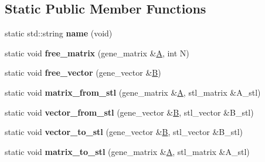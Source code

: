 \subsection*{Static Public Member Functions}
\begin{DoxyCompactItemize}
\item 
\mbox{\label{classublas__interface_a32117e7ead7a2a8f4e3d061c62effb40}} 
static std\+::string {\bfseries name} (void)
\item 
\mbox{\label{classublas__interface_a21c3496aaa06183e49f5cb6e07b50860}} 
static void {\bfseries free\+\_\+matrix} (gene\+\_\+matrix \&\hyperlink{group___core___module_class_eigen_1_1_matrix}{A}, int N)
\item 
\mbox{\label{classublas__interface_a82dfbf57b22b1604aa1027949fa89f06}} 
static void {\bfseries free\+\_\+vector} (gene\+\_\+vector \&\hyperlink{group___core___module_class_eigen_1_1_matrix}{B})
\item 
\mbox{\label{classublas__interface_a86c456f8a172a6d7bae92181bd57962b}} 
static void {\bfseries matrix\+\_\+from\+\_\+stl} (gene\+\_\+matrix \&\hyperlink{group___core___module_class_eigen_1_1_matrix}{A}, stl\+\_\+matrix \&A\+\_\+stl)
\item 
\mbox{\label{classublas__interface_a0a5a4f40ad048be8c066438f1f77ea5f}} 
static void {\bfseries vector\+\_\+from\+\_\+stl} (gene\+\_\+vector \&\hyperlink{group___core___module_class_eigen_1_1_matrix}{B}, stl\+\_\+vector \&B\+\_\+stl)
\item 
\mbox{\label{classublas__interface_a8b52f77a0ed244e5b7a7604120e84fc1}} 
static void {\bfseries vector\+\_\+to\+\_\+stl} (gene\+\_\+vector \&\hyperlink{group___core___module_class_eigen_1_1_matrix}{B}, stl\+\_\+vector \&B\+\_\+stl)
\item 
\mbox{\label{classublas__interface_af36a6f033d5fa349ccb3a116f161d524}} 
static void {\bfseries matrix\+\_\+to\+\_\+stl} (gene\+\_\+matrix \&\hyperlink{group___core___module_class_eigen_1_1_matrix}{A}, stl\+\_\+matrix \&A\+\_\+stl)
\item 
\mbox{\label{classublas__interface_a03447fe23509848cc3d84d6bb5dcad86}} 

\end{DoxyCompactItemize}
